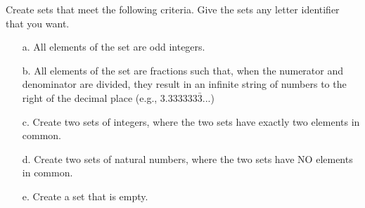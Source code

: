 \documentclass[a4paper,12pt]{book}
\newcounter{question}
\begin{document}
        \begin{questionNOGRADE}{\thequestion}

            Create sets that meet the following criteria.
            Give the sets any letter identifier that you want.

            \begin{enumerate}
                \item[a.]   All elements of the set are odd integers.

                \item[b.]   All elements of the set are fractions
                    such that, when the numerator and denominator are divided, they result in
                    an infinite string of numbers to the right
                    of the decimal place (e.g., $3.333333\bar{3}$...)

                \item[c.]   Create two sets of integers, where
                    the two sets have exactly two elements in common.

                \item[d.]   Create two sets of natural numbers,
                    where the two sets have NO elements in common.

                \item[e.]   Create a set that is empty.
            \end{enumerate}

        \end{questionNOGRADE}

        \notonkey{ \newpage }{ \hrulefill }
\end{document}
